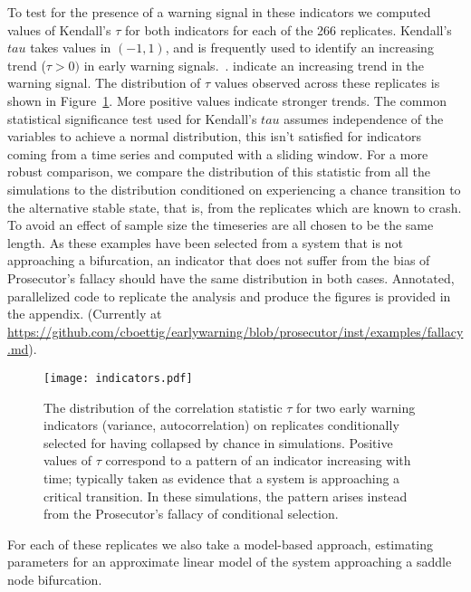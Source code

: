 \documentclass[authoryear,review,12pt]{elsarticle}
\begin{document}
To test for the presence of a warning signal in these indicators we computed
values of Kendall's $\tau$ for both indicators for each of the 266 replicates.
Kendall's $tau$ takes values in $(-1, 1)$, and is frequently used to identify
an increasing trend ($\tau > 0 )$ in early warning signals.~\citep{Dakos2008, Dakos2011}.
indicate an increasing trend in the warning signal.  The distribution of $\tau$ 
values observed across these replicates is shown in Figure~\ref{fig:indicator}.
More positive values indicate stronger trends. The common statistical significance
test used for Kendall's $tau$ assumes independence of the variables to achieve
a normal distribution, this isn't satisfied for indicators coming from a time 
series and computed with a sliding window.  For a more robust comparison, we 
compare the distribution of this statistic from all the simulations to the 
distribution conditioned on experiencing a chance transition to the alternative
stable state, that is, from the replicates which are known to crash.  To avoid 
an effect of sample size the timeseries are all chosen to be the same length.  
As these examples have been selected from a system that is not approaching a 
bifurcation, an indicator that does not suffer from the bias of Prosecutor's fallacy
should have the same distribution in both cases.   Annotated, parallelized code to 
replicate the analysis and produce the figures is provided in the appendix. 
(Currently at \href{https://github.com/cboettig/earlywarning/blob/prosecutor/inst/examples/fallacy.md}{https://github.com/cboettig/earlywarning/blob/prosecutor/inst/examples/fallacy.md}).  


\begin{figure}[H]
  \begin{center}
    \texttt{[image: indicators.pdf]}
  \end{center}
  \caption{The distribution of the correlation statistic $\tau$ for two early warning indicators (variance, autocorrelation) on replicates conditionally selected for having collapsed by chance in simulations. Positive values of $\tau$ correspond to a pattern of an indicator increasing with time; typically taken as evidence that a system is approaching a critical transition.  In these simulations, the pattern arises instead from the Prosecutor's fallacy of conditional selection.}
  \label{fig:indicator}
\end{figure}




For each of these replicates we also take a model-based approach, estimating 
parameters for an approximate linear model of the system approaching a
saddle node bifurcation.
\end{document}
